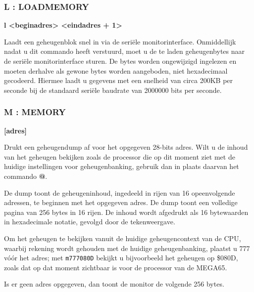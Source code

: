 \subsubsection{L : LOADMEMORY}
\begin{description}[leftmargin=2cm,style=nextline]
\item [Formaat:] {\bf l <beginadres> <eindadres + 1>}\item [Gebruik:] Laadt een geheugenblok snel in via de seriële monitorinterface. Onmiddellijk nadat u dit commando heeft verstuurd, moet u de te laden geheugenbytes naar de seriële monitorinterface sturen. De bytes worden ongewijzigd ingelezen en moeten derhalve als gewone bytes worden aangeboden, niet hexadecimaal gecodeerd. Hiermee laadt u gegevens met een snelheid van circa 200KB per seconde bij de standaard seriële baudrate van 2000000 bits per seconde.

\end{description}

\subsubsection{M : MEMORY}
\begin{description}[leftmargin=2cm,style=nextline]
\item [Formaat:] {\bf <m|M> [adres]}\item [Gebruik:] Drukt een geheugendump af voor het opgegeven 28-bits adres. Wilt u de inhoud van het geheugen bekijken zoals de processor die op dit moment ziet met de huidige instellingen voor geheugenbanking, gebruik dan in plaats daarvan het commando {\bf @}.

  De dump toont de geheugeninhoud, ingedeeld in rijen van 16 opeenvolgende adressen, te beginnen met het opgegeven adres. De dump toont een volledige pagina van 256 bytes in 16 rijen. De inhoud wordt afgedrukt als 16 bytewaarden in hexadecimale notatie, gevolgd door de tekenweergave.

  Om het geheugen te bekijken vanuit de huidige geheugencontext van de CPU, waarbij rekening wordt gehouden met de huidige geheugenbanking, plaatst u 777 vóór het adres; met {\tt m777080D} bekijkt u bijvoorbeeld het geheugen op \$080D, zoals dat op dat moment zichtbaar is voor de processor van de MEGA65.


\item [Opmerkingen:] Is er geen adres opgegeven, dan toont de monitor de volgende 256 bytes.

\end{description}

